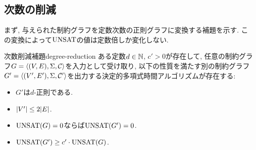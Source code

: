 \subsection{次数の削減}

まず, 与えられた制約グラフを定数次数の正則グラフに変換する補題を示す.
この変換によって$\mathrm{UNSAT}$の値は定数倍しか変化しない.

\begin{lemma}{次数削減補題}{degree-reduction}
  ある定数$d\in\mathbb{N}$, $c'>0$が存在して, 任意の制約グラフ$G=\langle(V,E),\Sigma,\mathcal{C}\rangle$を入力として受け取り, 以下の性質を満たす別の制約グラフ$G'=\langle(V',E'),\Sigma,\mathcal{C}'\rangle$を出力する決定的多項式時間アルゴリズムが存在する:
  \begin{itemize}
    \item $G'$は$d$-正則である.
    \item $\abs{V'} \le 2\abs{E}$.
    \item $\mathrm{UNSAT}(G)=0$ならば$\mathrm{UNSAT}(G')=0$.
    \item $\mathrm{UNSAT}(G') \ge c'\cdot \mathrm{UNSAT}(G)$.
  \end{itemize}
\end{lemma}

